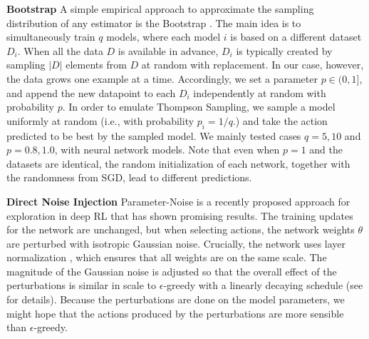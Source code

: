 \documentclass{article} \usepackage{iclr2018_conference,times}
\begin{document}
\textbf{Bootstrap} A simple empirical approach to approximate the sampling distribution of any estimator is the Bootstrap \citep{efron1982jackknife}.
The main idea is to simultaneously train $q$ models, where each model $i$ is based on a different dataset $D_i$.
When all the data $D$ is available in advance, $D_i$ is typically created by sampling $|D|$ elements from $D$ at random with replacement.
In our case, however, the data grows one example at a time.
Accordingly, we set a parameter $p \in (0, 1]$, and append the new datapoint to each $D_i$ independently at random with probability $p$.
In order to emulate Thompson Sampling, we sample a model uniformly at random (i.e., with probability $p_i = 1/q$.) and take the action predicted to be best by the sampled model.
We mainly tested cases $q=5, 10$ and $p = 0.8, 1.0$, with neural network models.
Note that even when $p=1$ and the datasets are identical, the random initialization of each network, together with the randomness from SGD, lead to different predictions.


\textbf{Direct Noise Injection}
Parameter-Noise \citep{Plappert17} is a recently proposed approach for exploration in deep RL that has shown promising results. The training updates for the network are unchanged, but when selecting actions, the network weights $\theta$ are perturbed with isotropic Gaussian noise. Crucially, the network uses layer normalization \citep{ba2016layer}, which ensures that all weights are on the same scale. The magnitude of the Gaussian noise is adjusted so that the overall effect of the perturbations is similar in scale to $\epsilon$-greedy with a linearly decaying schedule (see \citep{Plappert17} for details). Because the perturbations are done on the model parameters, we might hope that the actions produced by the perturbations are more sensible than $\epsilon$-greedy.
\end{document}
